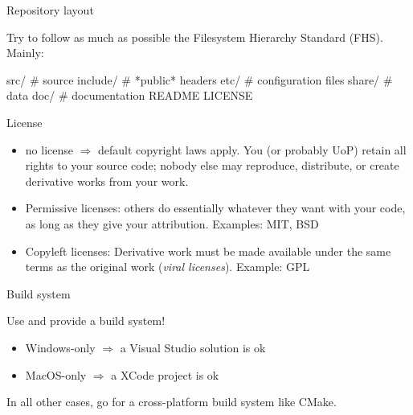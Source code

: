\documentclass[compress]{beamer}
\begin{document}
\begin{frame}[fragile]{Repository layout}

Try to follow as much as possible the {\Medium Filesystem Hierarchy
 Standard} (FHS). Mainly:

\begin{shcode}
src/        # source
include/    # *public* headers
etc/        # configuration files
share/      # data
doc/        # documentation
README
LICENSE
\end{shcode}

\centering


\end{frame}

\begin{frame}{License}
    \begin{itemize}
        \item {\Medium no license} $\Rightarrow$ default copyright laws apply.
            You (or probably UoP) retain all rights to your source code; nobody else may
            reproduce, distribute, or create derivative works from your work.
        \item {\Medium Permissive licenses}: others do essentially whatever they
            want with your code, as long as they give your attribution.
            Examples: MIT, BSD
        \item {\Medium Copyleft licenses}: Derivative work must be made
            available under the same terms as the original work (\emph{viral
            licenses}). Example: GPL
    \end{itemize}

    \centering



\end{frame}

\begin{frame}{Build system}

    Use and provide a build system!

    \begin{itemize}
        \item Windows-only $\Rightarrow$ a Visual Studio solution is ok
        \item MacOS-only $\Rightarrow$ a XCode project is ok
    \end{itemize}

    In all other cases, go for a cross-platform build system like {\Medium
    CMake}.
\end{frame}
\end{document}
